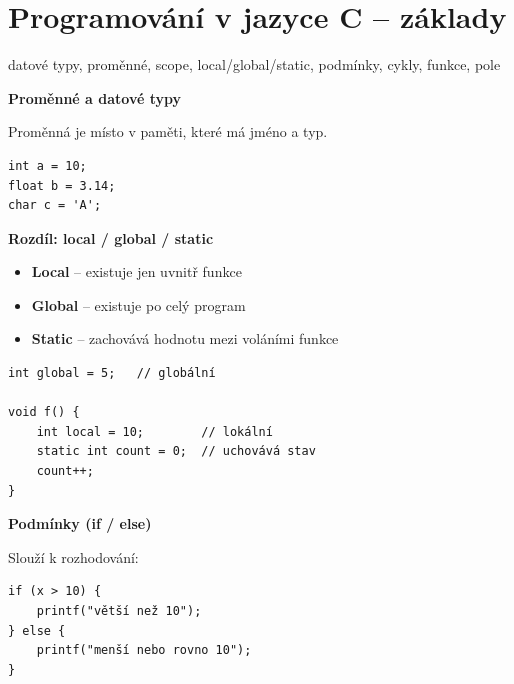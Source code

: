 \documentclass[a4paper,10pt]{article}
\begin{document}
\section{Programování v jazyce C – základy}

\begin{pojmybox}
datové typy, proměnné, scope, local/global/static,
podmínky, cykly, funkce, pole
\end{pojmybox}

\begin{vysvetlenibox}

\textbf{Proměnné a datové typy}

Proměnná je místo v paměti, které má jméno a typ.

\begin{vzorcebox}
\begin{verbatim}
int a = 10;
float b = 3.14;
char c = 'A';
\end{verbatim}
\end{vzorcebox}

\textbf{Rozdíl: local / global / static}

\begin{itemize}
\item \textbf{Local} – existuje jen uvnitř funkce
\item \textbf{Global} – existuje po celý program
\item \textbf{Static} – zachovává hodnotu mezi voláními funkce
\end{itemize}

\begin{vzorcebox}
\begin{verbatim}
int global = 5;   // globální

void f() {
    int local = 10;        // lokální
    static int count = 0;  // uchovává stav
    count++;
}
\end{verbatim}
\end{vzorcebox}

\textbf{Podmínky (if / else)}

Slouží k rozhodování:

\begin{vzorcebox}
\begin{verbatim}
if (x > 10) {
    printf("větší než 10");
} else {
    printf("menší nebo rovno 10");
}
\end{verbatim}
\end{vzorcebox}


\end{vysvetlenibox}
\end{document}

